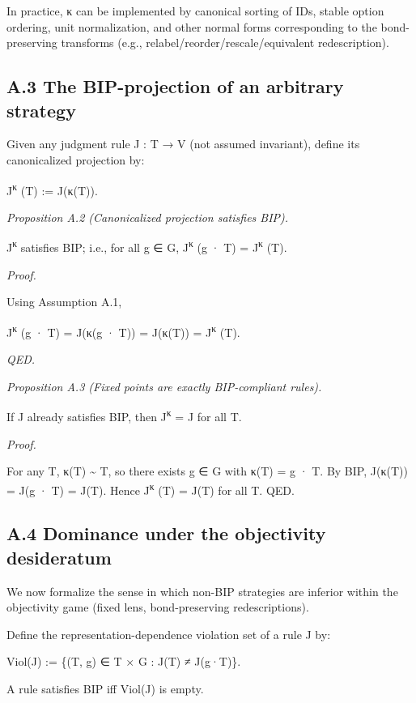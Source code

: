 \documentclass[12pt]{article}
\theoremstyle{plain}
\theoremstyle{definition}
\theoremstyle{remark}
\begin{document}
In practice, κ can be implemented by canonical sorting of IDs, stable
option ordering, unit normalization, and other normal forms
corresponding to the bond-preserving transforms (e.g.,
relabel/reorder/rescale/equivalent redescription).

\subsection{A.3 The BIP-projection of an arbitrary
strategy}\label{a.3-the-bip-projection-of-an-arbitrary-strategy}

Given any judgment rule J : T → V (not assumed invariant), define its
canonicalized projection by:

J\textsuperscript{κ} (T) := J(κ(T)).

\emph{Proposition A.2 (Canonicalized projection satisfies BIP).}

J\textsuperscript{κ} satisfies BIP; i.e., for all g ∈ G,
J\textsuperscript{κ} (g · T) = J\textsuperscript{κ} (T).

\emph{Proof.}

Using Assumption A.1,

J\textsuperscript{κ} (g · T) = J(κ(g · T)) = J(κ(T)) =
J\textsuperscript{κ} (T).

\emph{QED.}

\emph{Proposition A.3 (Fixed points are exactly BIP-compliant rules).}

If J already satisfies BIP, then J\textsuperscript{κ} = J for all T.

\emph{Proof.}

For any T, κ(T) \textasciitilde{} T, so there exists g ∈ G with κ(T) = g
· T. By BIP, J(κ(T)) = J(g · T) = J(T). Hence J\textsuperscript{κ} (T) =
J(T) for all T. QED.

\subsection{A.4 Dominance under the objectivity
desideratum}\label{a.4-dominance-under-the-objectivity-desideratum}

We now formalize the sense in which non-BIP strategies are inferior
within the objectivity game (fixed lens, bond-preserving
redescriptions).

Define the representation-dependence violation set of a rule J by:

Viol(J) := \{(T, g) ∈ T × G : J(T) ≠ J(g·T)\}.

A rule satisfies BIP iff Viol(J) is empty.
\end{document}
